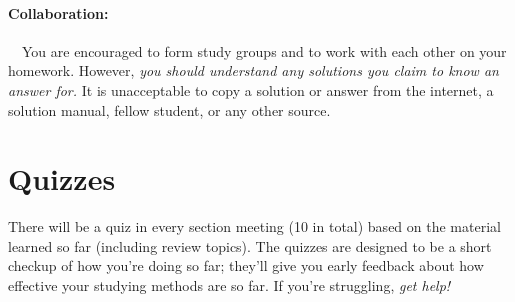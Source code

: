 \documentclass[11pt,letterpaper]{article}
\begin{document}


\paragraph*{Collaboration:}\ \ You are encouraged to form study groups
and to work with each other on your homework.  However, \emph{you
  should understand any solutions you claim to know an answer for.}  It
is unacceptable to copy a solution or answer from the internet, a
solution manual, fellow student, or any other source.


\section*{Quizzes}
There will be a quiz in every section meeting (10 in total) based on the material learned so far (including review topics). The quizzes are designed to be a short checkup of how you're doing so far; they'll give you early feedback about how effective your studying methods are so far. If you're struggling, \textit{get help! }
\end{document}

